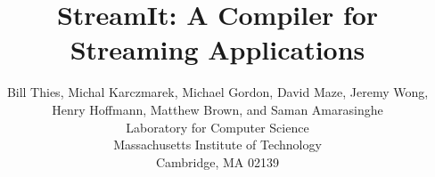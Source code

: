 \documentclass{sig-alternate}
\begin{document}
\title{StreamIt: A Compiler for Streaming Applications}


\author{
\alignauthor \vspace{-18pt}
Bill Thies, 
Michal Karczmarek, 
Michael Gordon, 
David Maze, 
Jeremy Wong,
Henry Hoffmann, 
Matthew Brown, 
and Saman Amarasinghe\\
	\vspace{6pt}
	Laboratory for Computer Science \\
	Massachusetts Institute of Technology \\
	Cambridge, MA  02139 \\
}

\newcommand{\ma}[2]{max_{#1 \rightarrow #2}}
\newcommand{\mi}[2]{sdep_{#1, #2}}
\newcommand{\floor}[2]{\left\lfloor\frac{#1}{#2}\right\rfloor}
\newcommand{\ceil}[2]{\left\lceil\frac{#1}{#2}\right\rceil}
\newcommand{\ra}[0]{\rightarrow}
\newcommand{\la}[0]{\lambda}

\def\fn#1{\mathop{\mbox{\it #1}}}
\def\fun#1#2{\ensuremath{\mathop{\mbox{\it #1}}(#2)}} %

\newtheorem{definition}{Definition}
\newtheorem{theorem}{Theorem}

\maketitle

\begin{abstract}

\end{abstract}









\begin{small}


\end{small}
\end{document}
